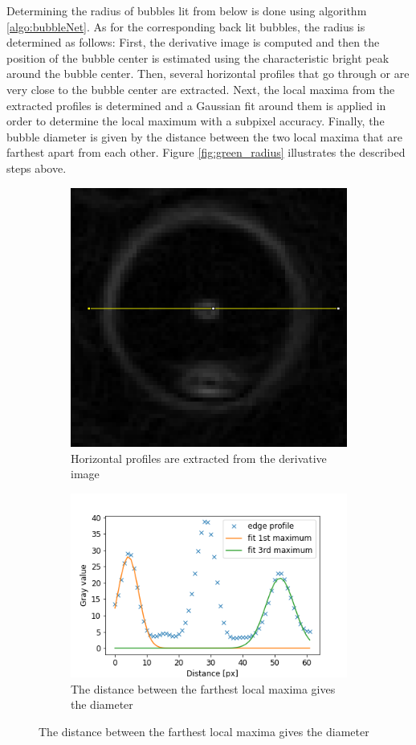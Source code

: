 			
			Determining the radius of bubbles lit from below is done using algorithm \ref{algo:bubbleNet}. As for the corresponding back lit bubbles, the radius is determined as follows:
			First, the derivative image is computed and then the position of the bubble center is estimated using the characteristic bright peak around the bubble center. Then, several horizontal profiles that go through or are very close to the bubble center are extracted. Next, the local maxima from the extracted profiles is determined and a Gaussian fit around them is applied in order to determine the local maximum with a subpixel accuracy. Finally, the bubble diameter is given by the distance between the two local maxima that are farthest apart from each other. Figure \ref{fig:green_radius} illustrates the described steps above. 
			
			\begin{figure}
				\centering

				\begin{subfigure}[t]{.4\textwidth}
					\centering
					\includegraphics[scale=0.3]{images/green_edges.png}
					\caption{Horizontal profiles are extracted from the derivative image}
				\end{subfigure}\hfill
				\begin{subfigure}[t]{.5\textwidth}
					\centering
					\includegraphics[scale=.6]{graphs/green_radius_demo.png}
					\caption{The distance between the farthest local maxima gives the diameter}
				\end{subfigure}
				

\end{figure}
